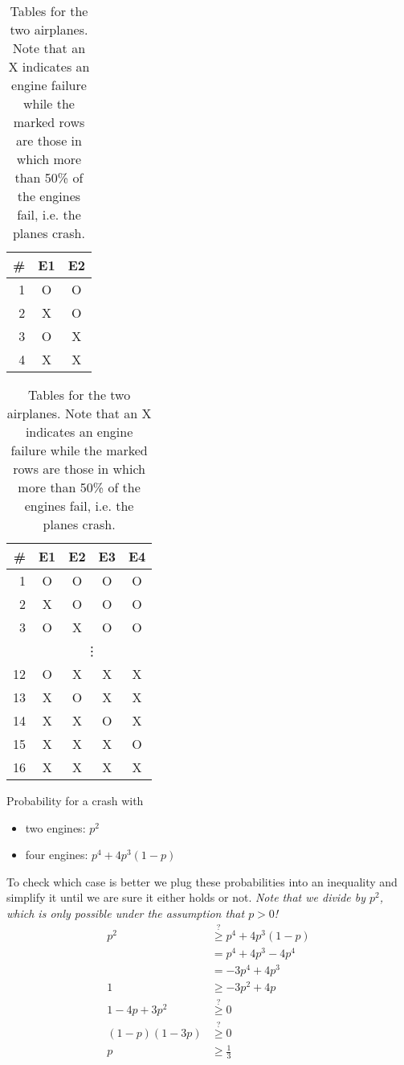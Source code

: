 \documentclass[../main/Notes.tex]{subfiles}
\begin{document}
\begin{table}[h]
  \centering
  \begin{subtable}[t]{.45\linewidth}
  \centering
    \begin{tabular}{r|cc}
    \# & E1 & E2 \\
    \hline
    1 & O & O \\
    2 & X & O \\
    3 & O & X \\
    \rowcolor{red!10}{}4 & X & X \\
    \end{tabular}
  \caption{two engine plane}
  \end{subtable}
  \hfill
  \begin{subtable}[t]{.45\linewidth}
  \centering
    \begin{tabular}{r|cccc}
    \# & E1 & E2 & E3 & E4 \\
    \hline
    1 & O & O & O & O \\
    2 & X & O & O & O \\
    3 & O & X & O & O \\
      & \multicolumn{4}{c}{\vdots} \\
    \rowcolor{red!10}{}12 & O & X & X & X \\
    \rowcolor{red!10}{}13 & X & O & X & X \\
    \rowcolor{red!10}{}14 & X & X & O & X \\
    \rowcolor{red!10}{}15 & X & X & X & O \\
    \rowcolor{red!10}{}16 & X & X & X & X 
    \end{tabular}
  \caption{four engine plane}
  \end{subtable}
  
\caption{Tables for the two airplanes. Note that an X indicates an engine failure while the marked rows are those in which more than 50\% of the engines fail, i.e. the planes crash.}
\label{tab:2014-06-06_planes}
\end{table}

Probability for a crash with 
\begin{itemize}
	\item two engines: $p^2$
  \item four engines: $p^4 + 4p^3\left(1-p\right)$
\end{itemize}

To check which case is better we plug these probabilities into an inequality and simplify it until we are sure it either holds or not. \emph{Note that we divide by $p^2$, which is only possible under the assumption that $p>0$!}
\begin{align*}
          p^2 &\stackrel{?}{\geq} p^4 + 4p^3 \left(1-p\right) \\
              &= p^4 + 4p^3 - 4p^4 \\
              &= -3p^4 + 4p^3 \\
            1 &\geq -3p^2 + 4p \\
1 - 4p + 3p^2 &\stackrel{?}{\geq} 0 \\
  (1-p)(1-3p) &\stackrel{?}{\geq} 0 \\
            p &\geq \frac{1}{3}
\end{align*}
\end{document}
